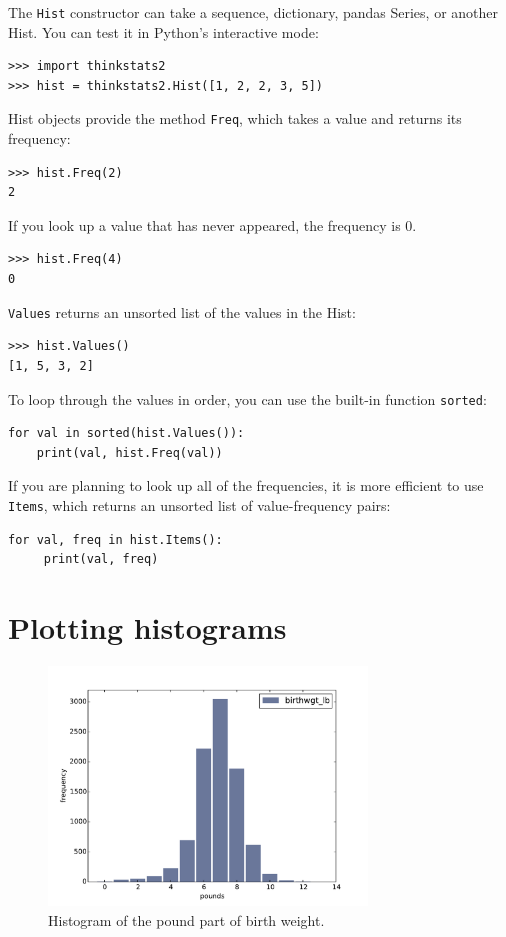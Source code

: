 \documentclass[12pt]{book}
\begin{document}
The {\tt Hist} constructor can take a sequence, dictionary, pandas
Series, or another Hist.  You can test it in Python's interactive
mode:
%
\begin{verbatim}
>>> import thinkstats2
>>> hist = thinkstats2.Hist([1, 2, 2, 3, 5])
\end{verbatim}

Hist objects provide the method {\tt Freq}, which takes a value and
returns its frequency:
%
\begin{verbatim}
>>> hist.Freq(2)
2
\end{verbatim}

If you look up a value that has never appeared, the frequency is 0.
%
\begin{verbatim}
>>> hist.Freq(4)
0
\end{verbatim}

{\tt Values} returns an unsorted list of the values in the Hist:
%
\begin{verbatim}
>>> hist.Values()
[1, 5, 3, 2]
\end{verbatim}

To loop through the values in order, you can use the built-in function
{\tt sorted}:
%
\begin{verbatim}
for val in sorted(hist.Values()):
    print(val, hist.Freq(val))
\end{verbatim}

If you are planning to look up all of the frequencies, it is more
efficient to use {\tt Items}, which returns an unsorted list of
value-frequency pairs:
%
\begin{verbatim}
for val, freq in hist.Items():
     print(val, freq)
\end{verbatim}


\section{Plotting histograms}

\begin{figure}
\centerline{\includegraphics[height=2.5in]{figs/first_wgt_lb_hist.pdf}}
\caption{Histogram of the pound part of birth weight.}
\label{first_wgt_lb_hist}
\end{figure}
\end{document}
